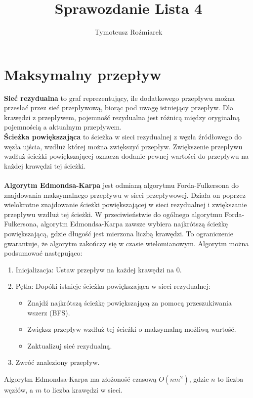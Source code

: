 \documentclass{article}
\title{Sprawozdanie Lista 4}
\author{Tymoteusz Roźmiarek}
\begin{document}
\maketitle
\justifying

\section*{Maksymalny przepływ}
\textbf{Sieć rezydualna} to graf reprezentujący, ile dodatkowego przepływu można przesłać przez sieć przepływową, biorąc pod uwagę istniejący przepływ. Dla krawędzi z przepływem, pojemność rezydualna jest różnicą między oryginalną pojemnością a aktualnym przepływem.\\
\textbf{Ścieżka powiększająca} to ścieżka w sieci rezydualnej z węzła źródłowego do węzła ujścia, wzdłuż której można zwiększyć przepływ. Zwiększenie przepływu wzdłuż ścieżki powiększającej oznacza dodanie pewnej wartości do przepływu na każdej krawędzi tej ścieżki.\\
\\
\textbf{Algorytm Edmondsa-Karpa} jest odmianą algorytmu Forda-Fulkersona do znajdowania maksymalnego przepływu w sieci przepływowej. Działa on poprzez wielokrotne znajdowanie ścieżki powiększającej w sieci rezydualnej i zwiększanie przepływu wzdłuż tej ścieżki. W przeciwieństwie do ogólnego algorytmu Forda-Fulkersona, algorytm Edmondsa-Karpa zawsze wybiera najkrótszą ścieżkę powiększającą, gdzie długość jest mierzona liczbą krawędzi. To ograniczenie gwarantuje, że algorytm zakończy się w czasie wielomianowym.
Algorytm można podsumować następująco:
\begin{enumerate}
\item Inicjalizacja: Ustaw przepływ na każdej krawędzi na 0.
\item Pętla: Dopóki istnieje ścieżka powiększająca w sieci rezydualnej:
\begin{itemize}
\item Znajdź najkrótszą ścieżkę powiększającą za pomocą przeszukiwania wszerz (BFS).
\item Zwiększ przepływ wzdłuż tej ścieżki o maksymalną możliwą wartość.
\item Zaktualizuj sieć rezydualną.
\end{itemize}
\item Zwróć znaleziony przepływ.
\end{enumerate}
Algorytm Edmondsa-Karpa ma złożoność czasową $O(nm^2)$, gdzie $n$ to liczba węzłów, a $m$ to liczba krawędzi w sieci.
\end{document}
